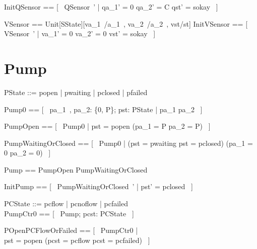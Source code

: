 \documentclass{report} %
\begin{document}
\begin{zed}
  InitQSensor == [~ QSensor~' | qa\_1' = 0 \land qa\_2' = C \land qst' = sokay ~]
\end{zed}

\begin{zed}
  VSensor == Unit[SState][va\_1~/a\_1~, va\_2~/a\_2~, vst/st]
  \also %
  InitVSensor == [~ VSensor~' | va\_1' = 0 \land va\_2' = 0 \land vst' = sokay ~]
\end{zed}

\section{Pump}
\begin{zed}
  PState ::= popen | pwaiting | pclosed | pfailed
\end{zed}

\begin{zed}
  Pump0 == [~ pa\_1~, pa\_2: \{0, P\}; pst: PState | pa\_1 \leq pa\_2 ~]
\end{zed}

\begin{zed}
  PumpOpen == [~ Pump0 | pst = popen \implies (pa\_1 = P \land pa\_2 = P) ~]
\end{zed}

\begin{zed}
  PumpWaitingOrClosed == [~ Pump0 | (pst = pwaiting \lor pst = pclosed) \implies (pa\_1 = 0 \land pa\_2 = 0) ~]
\end{zed}

\begin{zed}
  Pump == PumpOpen \land PumpWaitingOrClosed
\end{zed}

\begin{zed}
  InitPump == [~ PumpWaitingOrClosed~' | pst' = pclosed ~]
\end{zed}

\begin{zed}
  PCState ::= pcflow | pcnoflow | pcfailed \\
  PumpCtr0 == [~ Pump; pcst: PCState ~]
\end{zed}

\begin{zed}
  POpenPCFlowOrFailed == [~ PumpCtr0 | \\
      pst = popen \implies (pcst = pcflow \lor pcst = pcfailed) ~]
\end{zed}
\end{document}
